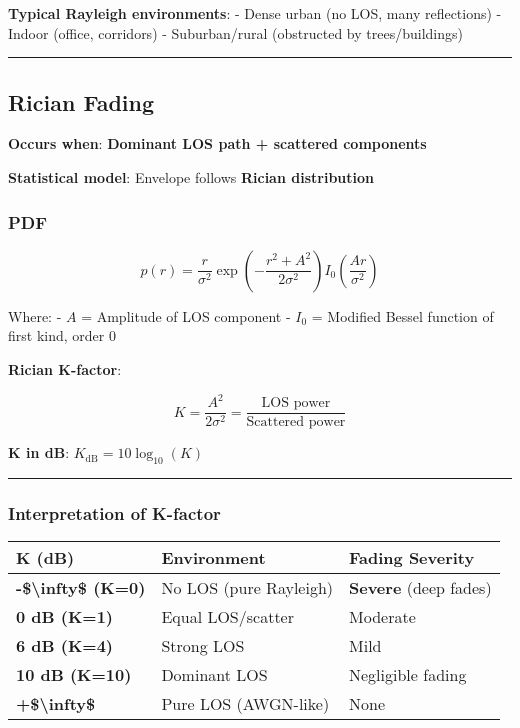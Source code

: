 \textbf{Typical Rayleigh environments}: - Dense urban (no LOS, many
reflections) - Indoor (office, corridors) - Suburban/rural (obstructed
by trees/buildings)

\begin{center}\rule{0.5\linewidth}{0.5pt}\end{center}

\subsection{Rician Fading}\label{rician-fading}

\textbf{Occurs when}: \textbf{Dominant LOS path + scattered components}

\textbf{Statistical model}: Envelope follows \textbf{Rician
distribution}

\subsubsection{PDF}\label{pdf}

\[
p(r) = \frac{r}{\sigma^2} \exp\left(-\frac{r^2 + A^2}{2\sigma^2}\right) I_0\left(\frac{Ar}{\sigma^2}\right)
\]

Where: - \(A\) = Amplitude of LOS component - \(I_0\) = Modified Bessel
function of first kind, order 0

\textbf{Rician K-factor}:

\[
K = \frac{A^2}{2\sigma^2} = \frac{\text{LOS power}}{\text{Scattered power}}
\]

\textbf{K in dB}: \(K_{\text{dB}} = 10\log_{10}(K)\)

\begin{center}\rule{0.5\linewidth}{0.5pt}\end{center}

\subsubsection{Interpretation of
K-factor}\label{interpretation-of-k-factor}

{\def\LTcaptype{} %
\begin{longtable}[]{@{}lll@{}}
\toprule\noalign{}
K (dB) & Environment & Fading Severity \\
\midrule\noalign{}
\endhead
\bottomrule\noalign{}
\endlastfoot
\textbf{-\$\textbackslash infty\$ (K=0)} & No LOS (pure Rayleigh) &
\textbf{Severe} (deep fades) \\
\textbf{0 dB (K=1)} & Equal LOS/scatter & Moderate \\
\textbf{6 dB (K=4)} & Strong LOS & Mild \\
\textbf{10 dB (K=10)} & Dominant LOS & Negligible fading \\
\textbf{+\$\textbackslash infty\$} & Pure LOS (AWGN-like) & None \\
\end{longtable}
}

